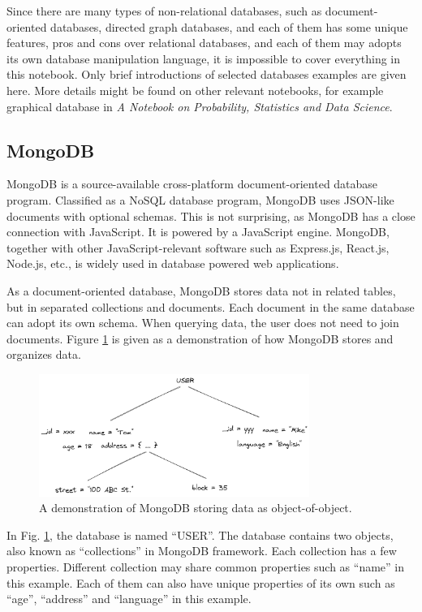 Since there are many types of non-relational databases, such as document-oriented databases, directed graph databases, and each of them has some unique features, pros and cons over relational databases, and each of them may adopts its own database manipulation language, it is impossible to cover everything in this notebook. Only brief introductions of selected databases examples are given here. More details might be found on other relevant notebooks, for example graphical database in \textit{A Notebook on Probability, Statistics and Data Science}. 

\subsection{MongoDB}

MongoDB is a source-available cross-platform document-oriented database program. Classified as a NoSQL database program, MongoDB uses JSON-like documents with optional schemas. This is not surprising, as MongoDB has a close connection with JavaScript. It is powered by a JavaScript engine. MongoDB, together with other JavaScript-relevant software such as Express.js, React.js, Node.js, etc., is widely used in database powered web applications.

As a document-oriented database, MongoDB stores data not in related tables, but in separated collections and documents. Each document in the same database can adopt its own schema. When querying data, the user does not need to join documents. Figure \ref{ch:database:mongotree} is given as a demonstration of how MongoDB stores and organizes data.
\begin{figure}
	\centering
	\includegraphics[width=250pt]{chapters/ch-database/figures/mongodb_tree.png}
	\caption{A demonstration of MongoDB storing data as object-of-object.} \label{ch:database:mongotree}
\end{figure}
In Fig. \ref{ch:database:mongotree}, the database is named ``USER''. The database contains two objects, also known as ``collections'' in MongoDB framework. Each collection has a few properties. Different collection may share common properties such as ``name'' in this example. Each of them can also have unique properties of its own such as ``age'', ``address'' and ``language'' in this example.

